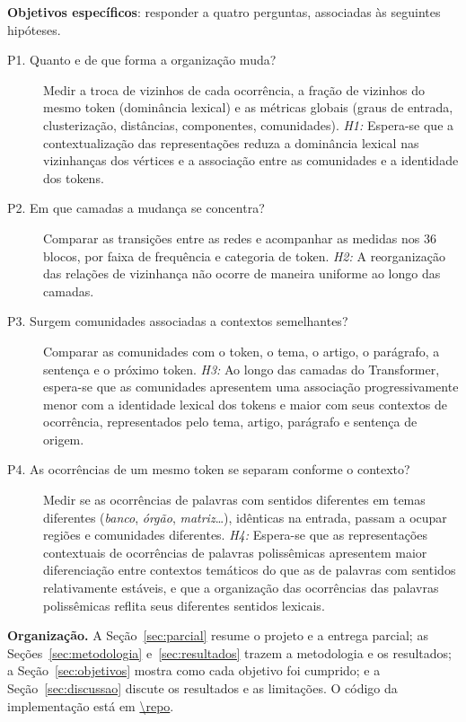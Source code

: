 \textbf{Objetivos específicos}: responder a quatro perguntas, associadas às seguintes hipóteses.
\begin{description}
    \item[P1. Quanto e de que forma a organização muda?] Medir a troca de vizinhos de cada
    ocorrência, a fração de vizinhos do mesmo token (dominância lexical) e as métricas globais
    (graus de entrada, clusterização, distâncias, componentes, comunidades). \emph{H1:} Espera-se
    que a contextualização das representações reduza a dominância lexical nas vizinhanças dos
    vértices e a associação entre as comunidades e a identidade dos tokens.
    \item[P2. Em que camadas a mudança se concentra?] Comparar as transições entre as redes e
    acompanhar as medidas nos 36 blocos, por faixa de frequência e categoria de token.
    \emph{H2:} A reorganização das relações de vizinhança não ocorre de maneira uniforme ao
    longo das camadas.
    \item[P3. Surgem comunidades associadas a contextos semelhantes?] Comparar as comunidades
    com o token, o tema, o artigo, o parágrafo, a sentença e o próximo token. \emph{H3:} Ao
    longo das camadas do Transformer, espera-se que as comunidades apresentem uma associação
    progressivamente menor com a identidade lexical dos tokens e maior com seus contextos de
    ocorrência, representados pelo tema, artigo, parágrafo e sentença de origem.
    \item[P4. As ocorrências de um mesmo token se separam conforme o contexto?] Medir se as
    ocorrências de palavras com sentidos diferentes em temas diferentes (\emph{banco},
    \emph{órgão}, \emph{matriz}\ldots), idênticas na entrada, passam a ocupar regiões e
    comunidades diferentes. \emph{H4:} Espera-se que as representações contextuais de
    ocorrências de palavras polissêmicas apresentem maior diferenciação entre contextos temáticos
    do que as de palavras com sentidos relativamente estáveis, e que a organização das
    ocorrências das palavras polissêmicas reflita seus diferentes sentidos lexicais.
\end{description}
\textbf{Organização.} A Seção~\ref{sec:parcial} resume o projeto e a entrega parcial; as
Seções~\ref{sec:metodologia} e~\ref{sec:resultados} trazem a metodologia e os resultados; a
Seção~\ref{sec:objetivos} mostra como cada objetivo foi cumprido; e a
Seção~\ref{sec:discussao} discute os resultados e as limitações. O código da implementação está
em \url{\repo}.
